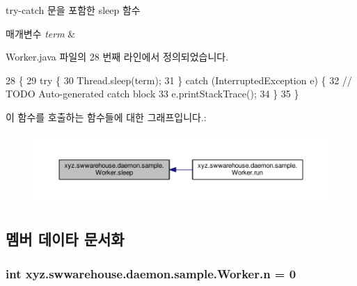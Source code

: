 try-\/catch 문을 포함한 sleep 함수 


\begin{DoxyParams}{매개변수}
{\em term} & \\
\hline
\end{DoxyParams}


Worker.\-java 파일의 28 번째 라인에서 정의되었습니다.


\begin{DoxyCode}
28                                   \{
29         \textcolor{keywordflow}{try} \{
30             Thread.sleep(term);
31         \} \textcolor{keywordflow}{catch} (InterruptedException e) \{
32             \textcolor{comment}{// TODO Auto-generated catch block}
33             e.printStackTrace();
34         \}
35     \}
\end{DoxyCode}


이 함수를 호출하는 함수들에 대한 그래프입니다.\-:\nopagebreak
\begin{figure}[H]
\begin{center}
\leavevmode
\includegraphics[width=350pt]{classxyz_1_1swwarehouse_1_1daemon_1_1sample_1_1_worker_ae9991783aa9ada529a18ecb5abdb4ad7_icgraph}
\end{center}
\end{figure}




\subsection{멤버 데이타 문서화}
\hypertarget{classxyz_1_1swwarehouse_1_1daemon_1_1sample_1_1_worker_aba3c26c1febb4e19bfc9562306bcee80}{
\subsubsection[{n}]{\setlength{\rightskip}{0pt plus 5cm}int xyz.\-swwarehouse.\-daemon.\-sample.\-Worker.\-n = 0\hspace{0.3cm}{\ttfamily [private]}}}\label{classxyz_1_1swwarehouse_1_1daemon_1_1sample_1_1_worker_aba3c26c1febb4e19bfc9562306bcee80}


